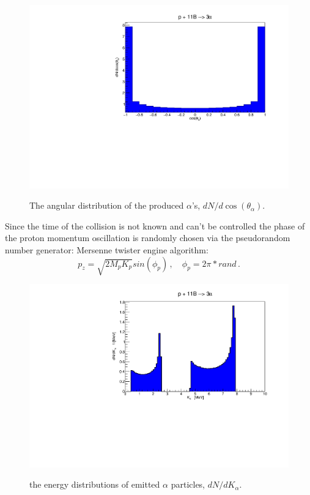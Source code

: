 \documentclass[aps,prc,twocolumn,floatfix,showpacs,a4paper,
nofootinbib,amsmath,amssymb]{revtex4}
\begin{document}
\begin{figure}[h]
	\begin{center}
		\resizebox{0.98\columnwidth}{!}
		{\includegraphics{dNdcostheta.pdf}}
		\caption{ The angular distribution of the produced $\alpha$'s, $dN/d\cos(\theta_\alpha)$. 
		}
		\label{dNdcostheta}
	\end{center}
\end{figure} 

Since the time of the collision is not known and can't be controlled the phase of the proton momentum oscillation is randomly chosen via the pseudorandom number generator: Mersenne twister engine algorithm: 
\begin{equation}
	p_z =\sqrt{2M_pK_p} sin(\phi_p) \,, \quad \phi_p=2\pi*rand\,.
\label{rand}	
\end{equation}



\begin{figure}[h]
	\begin{center}
		\resizebox{0.98\columnwidth}{!}
		{\includegraphics{dNdK.pdf}}
		\caption{ the energy distributions of emitted $\alpha$ particles, $dN/dK_{\alpha}$.
		}
		\label{dNdK}
	\end{center}
\end{figure} 
\end{document}
